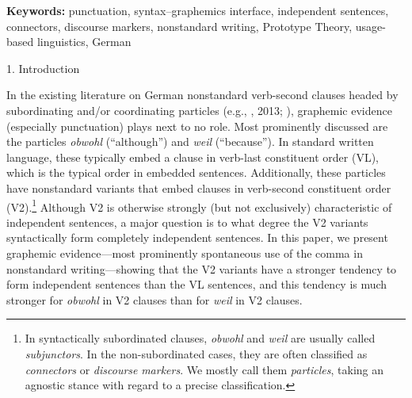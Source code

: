 \begin{styleMoutonAbstract}
\textbf{Keywords:} punctuation, syntax–graphemics interface, independent sentences, connectors, discourse markers, nonstandard writing, Prototype Theory, usage-based linguistics, German
\end{styleMoutonAbstract}

\begin{styleMoutonHeadingi}
1.  Introduction
\end{styleMoutonHeadingi}

\begin{styleMoutonText}
In the existing literature on German nonstandard verb-second clauses headed by subordinating and/or coordinating particles (e.g., \citealt{AntomoSteinbach2010}, 2013; \citealt{Reis2013}), graphemic evidence (especially punctuation) plays next to no role. Most prominently discussed are the particles \textit{obwohl} (“although”) and \textit{weil} (“because”). In standard written language, these typically embed a clause in verb-last constituent order (VL), which is the typical order in embedded sentences. Additionally, these particles have nonstandard variants that embed clauses in verb-second constituent order (V2).\footnote{In syntactically subordinated clauses, \textit{obwohl} and \textit{weil} are usually called \textit{subjunctors}. In the non-subordinated cases, they are often classified as \textit{connectors} or \textit{discourse} \textit{markers}. We mostly call them \textit{particles}, taking an agnostic stance with regard to a precise classification.} Although V2 is otherwise strongly (but not exclusively) characteristic of independent sentences, a major question is to what degree the V2 variants syntactically form completely independent sentences. In this paper, we present graphemic evidence—most prominently spontaneous use of the comma in nonstandard writing—showing that the V2 variants have a stronger tendency to form independent sentences than the VL sentences, and this tendency is much stronger for \textit{obwohl} in V2 clauses than for \textit{weil} in V2 clauses.
\end{styleMoutonText}

